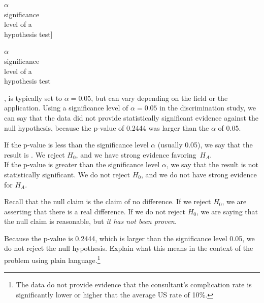 $\alpha$\\\footnotesize significance\\level of a\\hypothesis test]{\raggedright\vspace{-4mm}

$\alpha$\\\footnotesize significance\\level of a\\hypothesis test}, is typically set to $\alpha = 0.05$, but can vary depending on the field or the application. Using a significance level of $\alpha = 0.05$ in the discrimination study, we can say that the data did not provide statistically significant evidence against the null hypothesis, because the p-value of 0.2444 was larger than the $\alpha$ of 0.05.

\begin{termBox}{
If the p-value is less than the significance level $\alpha$ (usually 0.05), we say that the result is . We reject $H_0$, and we have strong evidence favoring~$H_A$. \\[2mm]
If the p-value is greater than the significance level $\alpha$, we say that the result is not statistically significant. We do not reject $H_0$, and we do not have strong evidence for $H_A$.}
\end{termBox}

Recall that the null claim is the claim of no difference. If we reject $H_0$, we are asserting that there is a real difference. If we do not reject $H_0$, we are saying that the null claim is reasonable, but \emph{it has not been proven}.

\begin{exercise} \label{plainLanguageExplanationOfHTConclusionForLiverDonorSurgicalConsultant}
Because the p-value is 0.2444, which is larger than the significance level 0.05, we do not reject the null hypothesis. Explain what this means in the context of the problem using plain language.\footnote{The data do not provide evidence that the consultant's complication rate is significantly lower or higher that the average US rate of 10\%.}
\end{exercise}

